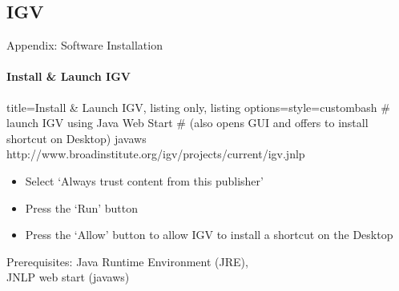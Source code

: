 \documentclass{beamer}
\begin{document}
\subsection*{IGV}
\begin{frame}[fragile]{Appendix: Software Installation}
\framesubtitle{Install \& Launch IGV}
\begin{tcblisting}{title={Install \& Launch IGV}, listing only, listing options={style=custombash}}
# launch IGV using Java Web Start 
# (also opens GUI and offers to install shortcut on Desktop)
javaws http://www.broadinstitute.org/igv/projects/current/igv.jnlp
\end{tcblisting}
\begin{itemize}
\item Select `Always trust content from this publisher'
\item Press the `Run' button
\item Press the `Allow' button to allow IGV to install a shortcut on the Desktop
\end{itemize}
Prerequisites:
Java Runtime Environment (JRE), \\
JNLP web start (javaws)
\end{frame}
\end{document}

